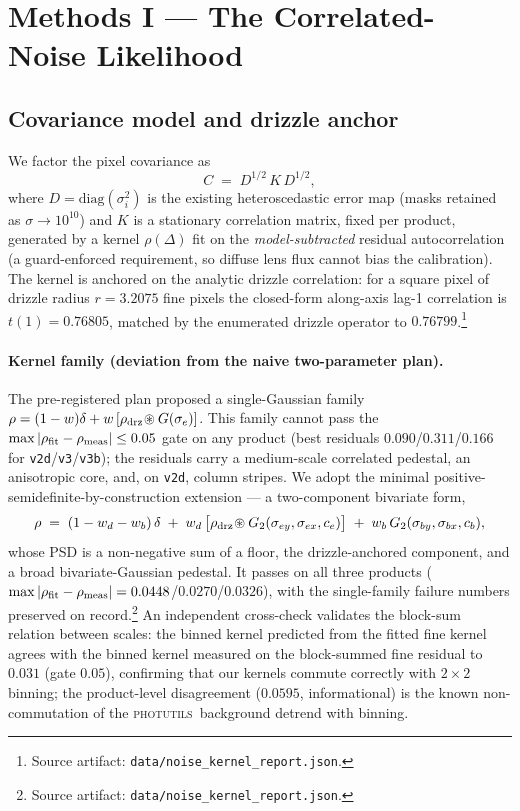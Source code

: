 \documentclass[11pt,letterpaper]{article}
\newcommand{\photutils}{\textsc{photutils}}
\newcommand{\art}[1]{\footnote{Source artifact: \texttt{#1}.}}
\newcommand{\dfile}[1]{\texttt{#1}}
\begin{document}
\section{Methods I --- The Correlated-Noise Likelihood}
\label{sec:methods1}

\subsection{Covariance model and drizzle anchor}

We factor the pixel covariance as
\begin{equation}
  C \;=\; D^{1/2}\,K\,D^{1/2},
  \label{eq:cov}
\end{equation}
where $D=\mathrm{diag}(\sigma_i^2)$ is the existing heteroscedastic error map
(masks retained as $\sigma\to10^{10}$) and $K$ is a stationary correlation
matrix, fixed per product, generated by a kernel $\rho(\Delta)$ fit on the
{\it model-subtracted} residual autocorrelation (a guard-enforced requirement,
so diffuse lens flux cannot bias the calibration). The kernel is anchored on
the analytic drizzle correlation: for a square pixel of drizzle radius
$r=3.2075$ fine pixels the closed-form along-axis lag-1 correlation is
$t(1)=0.76805$, matched by the enumerated drizzle operator to
$0.76799$.\art{data/noise\_kernel\_report.json}

\paragraph{Kernel family (deviation from the naive two-parameter plan).}
The pre-registered plan proposed a single-Gaussian family
$\rho=(1-w)\delta + w\,[\rho_{\rm drz}\!\circledast G(\sigma_e)]$. This family
cannot pass the $\max|\rho_{\rm fit}-\rho_{\rm meas}|\le0.05$ gate on any
product (best residuals $0.090$/$0.311$/$0.166$ for
\dfile{v2d}/\dfile{v3}/\dfile{v3b}); the residuals carry a medium-scale
correlated pedestal, an anisotropic core, and, on \dfile{v2d}, column stripes.
We adopt the minimal positive-semidefinite-by-construction extension --- a
two-component bivariate form,
\begin{equation}
  \rho \;=\; (1-w_d-w_b)\,\delta
        \;+\; w_d\,\bigl[\rho_{\rm drz}\!\circledast G_2(\sigma_{ey},\sigma_{ex},c_e)\bigr]
        \;+\; w_b\,G_2(\sigma_{by},\sigma_{bx},c_b),
  \label{eq:kernel}
\end{equation}
whose PSD is a non-negative sum of a floor, the drizzle-anchored component, and
a broad bivariate-Gaussian pedestal. It passes on all three products
($\max|\rho_{\rm fit}-\rho_{\rm meas}|=0.0448$/$0.0270$/$0.0326$), with the
single-family failure numbers preserved on
record.\art{data/noise\_kernel\_report.json} An independent cross-check
validates the block-sum relation between scales: the binned kernel predicted
from the fitted fine kernel agrees with the binned kernel measured on the
block-summed fine residual to $0.031$ (gate $0.05$), confirming that our
kernels commute correctly with $2\times2$ binning; the product-level
disagreement ($0.0595$, informational) is the known non-commutation of the
\photutils\ background detrend with binning.
\end{document}
